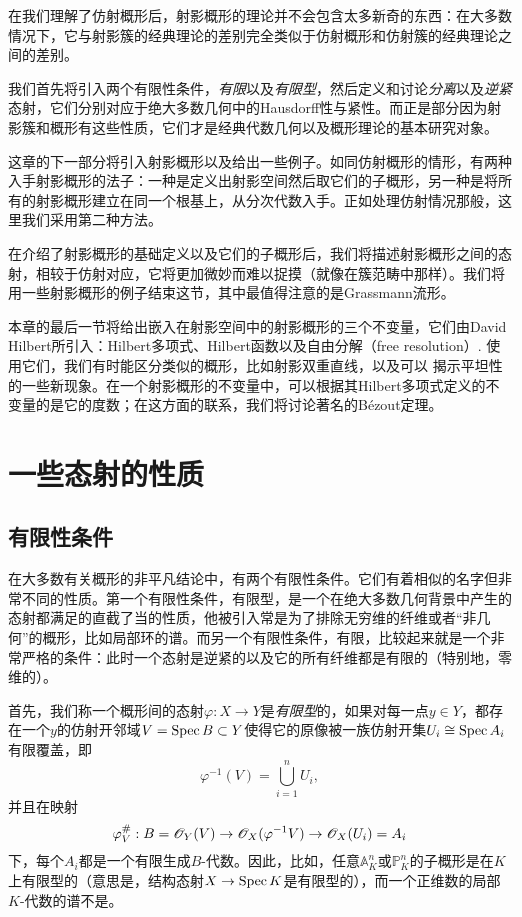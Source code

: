 在我们理解了仿射概形后，射影概形的理论并不会包含太多新奇的东西：在大多数情况下，它与射影簇的经典理论的差别完全类似于仿射概形和仿射簇的经典理论之间的差别。

我们首先将引入两个有限性条件，\textit{有限}以及\textit{有限型}，然后定义和讨论\textit{分离}以及\textit{逆紧}%
态射，它们分别对应于绝大多数几何中的Hausdorff性与紧性。而正是部分因为射影簇和概形有这些性质，它们才是经典代数几何以及概形理论的基本研究对象。

这章的下一部分将引入射影概形以及给出一些例子。如同仿射概形的情形，有两种入手射影概形的法子：一种是定义出射影空间然后取它们的子概形，另一种是将所有的射影概形建立在同一个根基上，从分次代数入手。正如处理仿射情况那般，这里我们采用第二种方法。

在介绍了射影概形的基础定义以及它们的子概形后，我们将描述射影概形之间的态射，相较于仿射对应，它将更加微妙而难以捉摸（就像在簇范畴中那样）。我们将用一些射影概形的例子结束这节，其中最值得注意的是Grassmann流形。

本章的最后一节将给出嵌入在射影空间中的射影概形的三个不变量，它们由David Hilbert所引入：Hilbert多项式、Hilbert函数以及自由分解（free resolution）. 使用它们，我们有时能区分类似的概形，比如射影双重直线，以及可以
揭示平坦性的一些新现象。在一个射影概形的不变量中，可以根据其Hilbert多项式定义的不变量的是它的度数；在这方面的联系，我们将讨论著名的B\'{e}zout定理。

\section{一些态射的性质}\label{s:3.1}

\subsection{有限性条件}\label{s:3.1.1}

在大多数有关概形的非平凡结论中，有两个有限性条件。它们有着相似的名字但非常不同的性质。第一个有限性条件，有限型，是一个在绝大多数几何背景中产生的态射都满足的直截了当的性质，他被引入常是为了排除无穷维的纤维或者“非几何”的概形，比如局部环的谱。而另一个有限性条件，有限，比较起来就是一个非常严格的条件：此时一个态射是逆紧的以及它的所有纤维都是有限的（特别地，零维的）。

首先，我们称一个概形间的态射$\varphi:X\to Y$是\textit{有限型}的，如果对每一点$y\in Y$，都存在一个$y$的仿射开邻域$V=\operatorname{Spec} B\subset Y$使得它的原像被一族仿射开集$U_i\cong \operatorname{Spec} A_i$有限覆盖，即
\[
	\varphi^{-1}(V)=\bigcup_{i=1}^n U_i,
\]
并且在映射
\[
	\varphi_V^\#:B=\mathscr{O}_Y(V)\to \mathscr{O}_X (\varphi^{-1}V)\to \mathscr{O}_X(U_i)=A_i
\]
下，每个$A_i$都是一个有限生成$B$\hyp 代数。因此，比如，任意$\mathbb{A}_K^n$或$\mathbb{P}_K^n$的子概形是在$K$上有限型的（意思是，结构态射$X\to \operatorname{Spec} K$是有限型的），而一个正维数的局部$K$\hyp 代数的谱不是。

